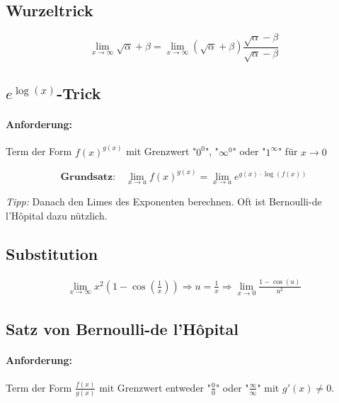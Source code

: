 \documentclass[11pt]{article}
\begin{document}
\subsection{Wurzeltrick}

\begin{equation*}
	\lim_{x\to\infty} \sqrt{\alpha}+\beta = \lim_{x\to\infty}(\sqrt{\alpha}+\beta)\frac{\sqrt{\alpha}-\beta}{\sqrt{\alpha}-\beta}
\end{equation*}

\subsection{$e^{\log(x)}$-Trick}

\paragraph{Anforderung:}Term der Form $f(x)^{g(x)}$ mit Grenzwert "$0^0$", "$\infty^0$" oder "$1^\infty$" f{\"u}r $x \to 0$

\begin{equation*}
	\textbf{Grundsatz:}\quad\lim_{x\to a}f(x)^{g(x)} = \lim_{x\to a}e^{g(x) \cdot \log(f(x))}
\end{equation*}

\emph{Tipp:} Danach den Limes des Exponenten berechnen. Oft ist Bernoulli-de l'H{\^o}pital dazu n{\"u}tzlich.

\subsection{Substitution}

\begin{equation*}
\begin{split}
	\lim_{x\to \infty} x^2(1 - \cos(\frac{1}{x})) \Rightarrow u = \frac{1}{x} \Rightarrow \lim_{x\to 0} \frac{1 - \cos(u)}{u^2}
\end{split}
\end{equation*}

\subsection{Satz von Bernoulli-de l'H{\^o}pital}

\paragraph{Anforderung:}Term der Form $\frac{f(x)}{g(x)}$ mit Grenzwert entweder "$\frac{0}{0}$" oder "$\frac{\infty}{\infty}$" mit $g'(x) \neq 0$. \\
\end{document}
